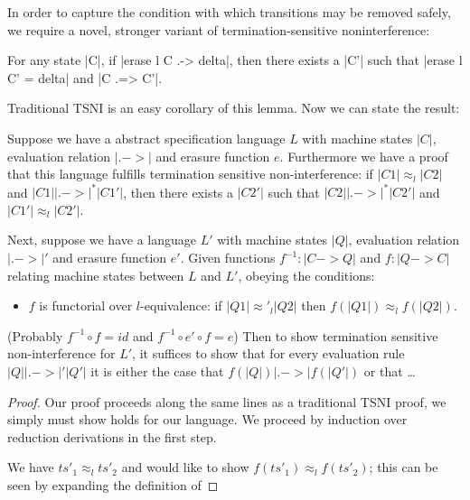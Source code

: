 In order to capture the condition with which transitions may be removed
safely, we require a novel, stronger variant of termination-sensitive
noninterference:

\begin{lemma}
    For any state |C|, if |erase l C .-> delta|, then there exists a |C'| such that
    |erase l C' = delta| and |C .=> C'|.
\end{lemma}

Traditional TSNI is an easy corollary of this lemma.  Now we can state
the result:

\begin{theorem}
    Suppose we have a abstract specification language $L$ with machine
    states $|C|$, evaluation relation $|.->|$ and erasure function $e$.
    Furthermore we have a proof that this language fulfills termination
    sensitive non-interference: if $|C1| \approx_l |C2|$ and $|C1|
    |.->|^* |C1'|$, then there exists a $|C2'|$ such that $|C2| |.->|^*
    |C2'|$ and $|C1'| \approx_l |C2'|$.

    Next, suppose we have a language $L'$ with machine states $|Q|$,
    evaluation relation $|.->|'$ and erasure function $e'$.  Given
    functions $f^{-1} : |C -> Q|$ and $f : |Q -> C|$ relating machine
    states between $L$ and $L'$, obeying the conditions:

    \begin{itemize}
        \item $f$ is functorial over $l$-equivalence: if
            $|Q1| \approx'_l |Q2|$ then $f(|Q1|) \approx_l f(|Q2|)$.
    \end{itemize}
    
    (Probably $f^{-1} \circ f =
    id$ and $f^{-1} \circ e' \circ f = e$)  Then to show termination sensitive non-interference for $L'$,
    it suffices to show that for every evaluation rule $|Q| |.->|' |Q'|$
    it is either the case that $f(|Q|) |.->| f(|Q'|)$ or that
    \ldots
\end{theorem}

\begin{proof}
Our proof proceeds along the same lines as a traditional TSNI proof,
we simply must show  holds for our language.  We proceed by induction
over reduction derivations in the first step.

We have $ts'_1 \approx_l ts'_2$ and would like to show $f(ts'_1) \approx_l f(ts'_2)$;
this can be seen by expanding the definition of
\end{proof}

